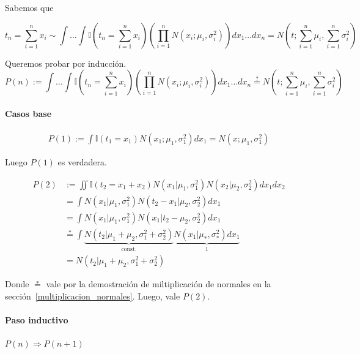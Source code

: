 \documentclass[article]{jss}
\begin{document}
\begin{appendix}
Sabemos que

\begin{equation}
t_n = \sum_{i=1}^n x_i \sim \int \dots \int \mathbb{I}(t_n= \sum_{i=1}^n x_i ) \left( \prod_{i=1}^n N(x_i;\mu_i,\sigma_i^2) \right) dx_1 \dots dx_n = N(t;\sum_{i=1}^n \mu_i,\sum_{i=1}^n \sigma_i^2 )
\end{equation}


Queremos probar por inducci\'on.
\begin{equation}
 P(n):= \int \dots \int \mathbb{I}(t_n= \sum_{i=1}^n x_i ) \left( \prod_{i=1}^n N(x_i;\mu_i,\sigma_i^2) \right) dx_1 \dots dx_n \overset{?}{=} N(t;\sum_{i=1}^n \mu_i,\sum_{i=1}^n \sigma_i^2 )
\end{equation}

\paragraph{Casos base}

\begin{equation}
\begin{split}
 P(1) := \int \mathbb{I}(t_1 = x_1) N(x_1;\mu_1,\sigma_1^2) dx_1 = N(x;\mu_1,\sigma_1^2)
\end{split}
\end{equation}

Luego $P(1)$ es verdadera.

\begin{equation}
 \begin{split}
P(2) & := \iint \mathbb{I}(t_2 = x_1 + x_2) N(x_1|\mu_1, \sigma_1^2)N(x_2|\mu_2, \sigma_2^2) dx_1dx_2 \\
 &= \int N(x_1|\mu_1, \sigma_1^2) N(t_2 - x_1|\mu_2, \sigma_2^2) dx_1   \\
 & = \int N(x_1|\mu_1, \sigma_1^2) N(x_1|t_2 - \mu_2, \sigma_2^2) dx_1 \\
 & \overset{*}{=} \int \underbrace{N(t_2|\mu_1+\mu_2,\sigma_1^2 + \sigma_2^2)}_{\text{const.}} \underbrace{N(x_1|\mu_{*},\sigma_{*}^2) dx_1}_{1} \\
 & = N(t_2|\mu_1+\mu_2,\sigma_1^2 + \sigma_2^2)
 \end{split}
 \end{equation}

 Donde $\overset{*}{=}$ vale por la demostraci\'on de miltiplicaci\'on de normales en la secci\'on~\ref{multiplicacion_normales}.
 Luego, vale $P(2)$.


\paragraph{Paso inductivo} $P(n) \Rightarrow P(n+1)$


\end{appendix}
\end{document}
